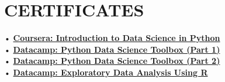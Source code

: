 \documentclass[letterpaper]{deedy-resume} %
\begin{document}

\newpage %

\begin{minipage}[t]{0.33\textwidth} %

\section{CERTIFICATES}
• \href{https://www.coursera.org/account/accomplishments/certificate/PB48PJLRP5VQ}{\bf Coursera: Introduction to Data Science in Python} \\
• \href{https://www.datacamp.com/courses/python-data-science-toolbox-part-1}{\bf Datacamp: Python Data Science Toolbox (Part 1) } \\
• \href{https://www.datacamp.com/courses/python-data-science-toolbox-part-2}{\bf Datacamp: Python Data Science Toolbox (Part 2) } \\
• \href{https://www.datacamp.com/courses/exploratory-data-analysis}{\bf Datacamp: Exploratory Data Analysis Using R
 }
\end{minipage} %
\hfill
\end{document}
